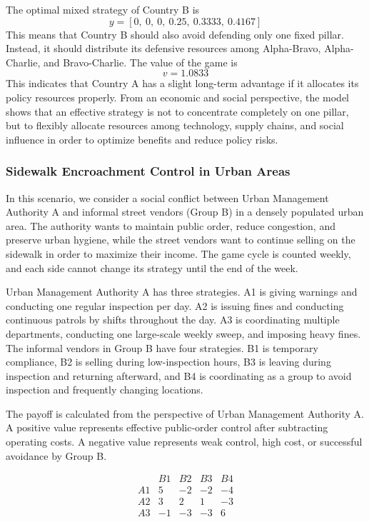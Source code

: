 \documentclass[12pt,a4paper]{article}
\begin{document}
The optimal mixed strategy of Country B is
\[
y=[0,\ 0,\ 0,\ 0.25,\ 0.3333,\ 0.4167]
\]
This means that Country B should also avoid defending only one fixed pillar. Instead, it should distribute its defensive resources among Alpha-Bravo, Alpha-Charlie, and Bravo-Charlie. The value of the game is
\[
v=1.0833
\]
This indicates that Country A has a slight long-term advantage if it allocates its policy resources properly. From an economic and social perspective, the model shows that an effective strategy is not to concentrate completely on one pillar, but to flexibly allocate resources among technology, supply chains, and social influence in order to optimize benefits and reduce policy risks.

\subsubsection{Sidewalk Encroachment Control in Urban Areas}

In this scenario, we consider a social conflict between Urban Management Authority A and informal street vendors (Group B) in a densely populated urban area. The authority wants to maintain public order, reduce congestion, and preserve urban hygiene, while the street vendors want to continue selling on the sidewalk in order to maximize their income. The game cycle is counted weekly, and each side cannot change its strategy until the end of the week.

Urban Management Authority A has three strategies. A1 is giving warnings and conducting one regular inspection per day. A2 is issuing fines and conducting continuous patrols by shifts throughout the day. A3 is coordinating multiple departments, conducting one large-scale weekly sweep, and imposing heavy fines. The informal vendors in Group B have four strategies. B1 is temporary compliance, B2 is selling during low-inspection hours, B3 is leaving during inspection and returning afterward, and B4 is coordinating as a group to avoid inspection and frequently changing locations.

The payoff is calculated from the perspective of Urban Management Authority A. A positive value represents effective public-order control after subtracting operating costs. A negative value represents weak control, high cost, or successful avoidance by Group B.

\begingroup
\small
\renewcommand{\arraystretch}{0.75}
\setlength{\arraycolsep}{4pt}
\[
\begin{array}{c|cccc}
 & B1 & B2 & B3 & B4 \\
\hline
A1 & 5 & -2 & -2 & -4 \\
A2 & 3 & 2 & 1 & -3 \\
A3 & -1 & -3 & -3 & 6
\end{array}
\]
\endgroup
\end{document}
